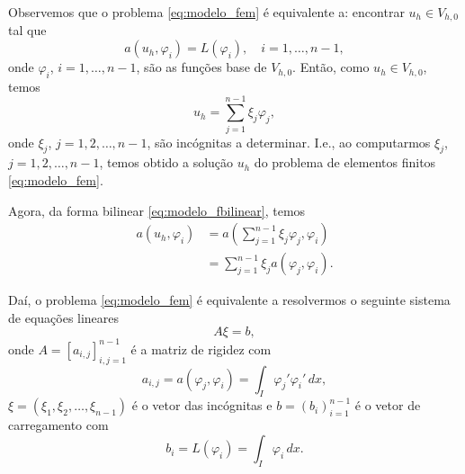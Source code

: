 Observemos que o problema \eqref{eq:modelo_fem} é equivalente a: encontrar $u_h\in V_{h,0}$ tal que
\begin{equation}
  a(u_h,\varphi_i) = L(\varphi_i),\quad i=1, \dotsc, n-1,
\end{equation}
onde $\varphi_i$, $i=1,\dotsc,n-1$, são as funções base de $V_{h,0}$. Então, como $u_h\in V_{h,0}$, temos
\begin{equation}
  u_h = \sum_{j=1}^{n-1}\xi_j\varphi_j,
\end{equation}
onde $\xi_j$, $j=1,2,\dotsc,n-1$, são incógnitas a determinar. I.e., ao computarmos $\xi_j$, $j=1,2,\dotsc,n-1$, temos obtido a solução $u_h$ do problema de elementos finitos \ref{eq:modelo_fem}.

Agora, da forma bilinear \eqref{eq:modelo_fbilinear}, temos
\begin{align}
  a(u_h,\varphi_i) &= a\left(\sum_{j=1}^{n-1}\xi_j\varphi_j,\varphi_i\right)\\
  &= \sum_{j=1}^{n-1}\xi_j a(\varphi_j,\varphi_i).
\end{align}

Daí, o problema \eqref{eq:modelo_fem} é equivalente a resolvermos o seguinte sistema de equações lineares
\begin{equation}\label{eq:modelo_fem_sis}
  A\xi = b,
\end{equation}
onde $A = [a_{i,j}]_{i,j=1}^{n-1}$ é a matriz de rigidez com
\begin{equation}
  a_{i,j} = a(\varphi_j,\varphi_i) = \int_{I}\varphi_j'\varphi_i'\,dx,
\end{equation}
$\xi = (\xi_1,\xi_2,\dotsc,\xi_{n-1})$ é o vetor das incógnitas e $b = (b_{i})_{i=1}^{n-1}$ é o vetor de carregamento com
\begin{equation}
  b_i = L(\varphi_i) = \int_I\varphi_i\,dx.
\end{equation}

